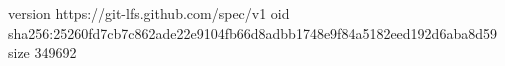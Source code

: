 version https://git-lfs.github.com/spec/v1
oid sha256:25260fd7cb7c862ade22e9104fb66d8adbb1748e9f84a5182eed192d6aba8d59
size 349692
